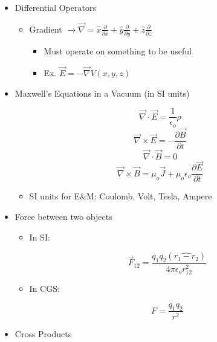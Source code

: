 \begin{itemize}
  \item Differential Operators

    \begin{itemize}

      \item Gradient $\longrightarrow \vec{\nabla}=\hat{x}\frac{\partial}{\partial x}+\hat{y}\frac{\partial}{\partial y} + \hat{z}\frac{\partial}{\partial z}$

        \begin{itemize}

          \item Must operate on something to be useful

          \item Ex. $\vec{E}=-\vec{\nabla}V(x,y,z)$

        \end{itemize}

    \end{itemize}

  \item Maxwell's Equations in a Vacuum (in SI units)

    $$\vec{\nabla}\cdot\vec{E}=\frac{1}{\epsilon_o}\rho$$
    $$\vec{\nabla}\times\vec{E}=-\frac{\partial\vec{B}}{\partial t}$$
    $$\vec{\nabla}\cdot\vec{B}=0$$
    $$\vec{\nabla}\times\vec{B}=\mu_o\vec{J}+\mu_o\epsilon_o\frac{\partial\vec{E}}{\partial t}$$

    \begin{itemize}

      \item SI units for E\&M: Coulomb, Volt, Tesla, Ampere

    \end{itemize}

  \item Force between two objects

    \begin{itemize}

      \item In SI:

        $$\vec{F}_{12}=\frac{q_1q_2(\widehat{r_1-r_2})}{4\pi\epsilon_o r_{12}^2}$$

      \item In CGS:

        $$F=\frac{q_1q_2}{r^2}$$

    \end{itemize}

  \item Cross Products


\end{itemize}
